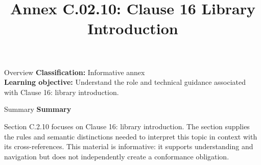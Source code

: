 \documentclass[10pt,letterpaper]{article}
\title{Annex C.02.10: Clause 16 Library Introduction}
\author{}
\date{}
\begin{document}
\maketitle
\begin{CornellOverviewBox}{Overview}
\textbf{Classification:} Informative annex\\[2pt]
\textbf{Learning objective:} Understand the role and technical guidance associated with Clause 16: library introduction.
\end{CornellOverviewBox}\begin{CornellSummaryBox}{Summary}
{\sffamily\bfseries\color{Accent} Summary}\par\vspace{3pt}Section C.2.10 focuses on Clause 16: library introduction. The section supplies the rules and semantic distinctions needed to interpret this topic in context with its cross-references. This material is informative: it supports understanding and navigation but does not independently create a conformance obligation.
\end{CornellSummaryBox}
\end{document}

